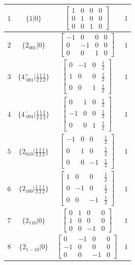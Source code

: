 \documentclass[fleqn,8pt]{jsarticle}
\begin{document}
\begin{longtable}{cccc}
$ 1 $ & $ \{1|0\} $ & $ \begin{bmatrix} 1 & 0 & 0 & 0 \\ 0 & 1 & 0 & 0 \\ 0 & 0 & 1 & 0 \end{bmatrix} $ & $ 1 $ \\ \hline
$ 2 $ & $ \{2{}_{001}|0\} $ & $ \begin{bmatrix} -1 & 0 & 0 & 0 \\ 0 & -1 & 0 & 0 \\ 0 & 0 & 1 & 0 \end{bmatrix} $ & $ 1 $ \\ \hline
$ 3 $ & $ \{4^{+}_{\,\,001}|\frac{1}{2} \frac{1}{2} \frac{1}{2}\} $ & $ \begin{bmatrix} 0 & -1 & 0 & \frac{1}{2} \\ 1 & 0 & 0 & \frac{1}{2} \\ 0 & 0 & 1 & \frac{1}{2} \end{bmatrix} $ & $ 1 $ \\ \hline
$ 4 $ & $ \{4^{-}_{\,\,001}|\frac{1}{2} \frac{1}{2} \frac{1}{2}\} $ & $ \begin{bmatrix} 0 & 1 & 0 & \frac{1}{2} \\ -1 & 0 & 0 & \frac{1}{2} \\ 0 & 0 & 1 & \frac{1}{2} \end{bmatrix} $ & $ 1 $ \\ \hline
$ 5 $ & $ \{2{}_{010}|\frac{1}{2} \frac{1}{2} \frac{1}{2}\} $ & $ \begin{bmatrix} -1 & 0 & 0 & \frac{1}{2} \\ 0 & 1 & 0 & \frac{1}{2} \\ 0 & 0 & -1 & \frac{1}{2} \end{bmatrix} $ & $ 1 $ \\ \hline
$ 6 $ & $ \{2{}_{100}|\frac{1}{2} \frac{1}{2} \frac{1}{2}\} $ & $ \begin{bmatrix} 1 & 0 & 0 & \frac{1}{2} \\ 0 & -1 & 0 & \frac{1}{2} \\ 0 & 0 & -1 & \frac{1}{2} \end{bmatrix} $ & $ 1 $ \\ \hline
$ 7 $ & $ \{2{}_{110}|0\} $ & $ \begin{bmatrix} 0 & 1 & 0 & 0 \\ 1 & 0 & 0 & 0 \\ 0 & 0 & -1 & 0 \end{bmatrix} $ & $ 1 $ \\ \hline
$ 8 $ & $ \{2{}_{1-10}|0\} $ & $ \begin{bmatrix} 0 & -1 & 0 & 0 \\ -1 & 0 & 0 & 0 \\ 0 & 0 & -1 & 0 \end{bmatrix} $ & $ 1 $ \\
\end{longtable}
\end{document}
